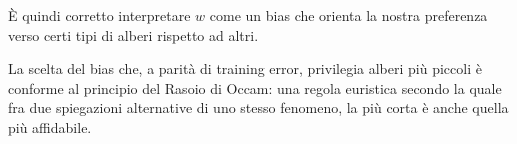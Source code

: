 \documentclass[\main/main.tex]{subfiles}
\begin{document}
\begin{example}
\begin{multicols}{2}
        È quindi corretto interpretare \(w\) come un bias che orienta la nostra preferenza verso certi tipi di alberi rispetto ad altri.
        
        La scelta del bias che, a parità di training error, privilegia alberi più piccoli è conforme al principio del Rasoio di Occam: una regola euristica secondo la quale fra due spiegazioni alternative di uno stesso fenomeno, la più corta è anche quella più affidabile.
    \end{multicols}
\end{example}
\end{document}
